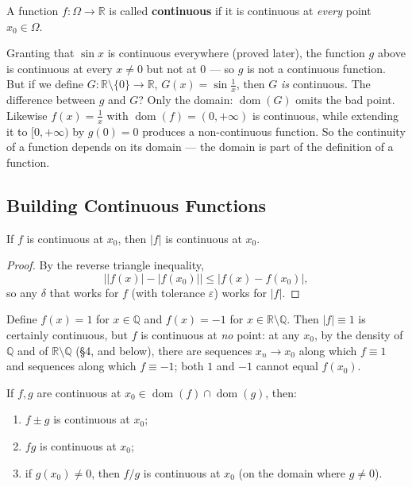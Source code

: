 \documentclass[11pt]{report}
\begin{document}
\begin{defbox}
A function $f: \Omega \to \mathbb{R}$ is called \textbf{continuous} if it is continuous at \emph{every} point $x_0 \in \Omega$.
\end{defbox}

\begin{rembox}
Granting that $\sin x$ is continuous everywhere (proved later), the function $g$ above is continuous at every $x \neq 0$ but not at $0$ --- so $g$ is not a continuous function. But if we define $G: \mathbb{R} \setminus \{0\} \to \mathbb{R}$, $G(x) = \sin\tfrac1x$, then $G$ \emph{is} continuous. The difference between $g$ and $G$? Only the domain: $\operatorname{dom}(G)$ omits the bad point. Likewise $f(x) = \tfrac1x$ with $\operatorname{dom}(f) = (0,+\infty)$ is continuous, while extending it to $[0,+\infty)$ by $g(0) = 0$ produces a non-continuous function. So the continuity of a function depends on its domain --- the domain is part of the definition of a function.
\end{rembox}

\subsection{Building Continuous Functions}

\begin{thmbox}
If $f$ is continuous at $x_0$, then $|f|$ is continuous at $x_0$.
\end{thmbox}

\begin{proof}
By the reverse triangle inequality,
\[
\bigl| |f(x)| - |f(x_0)| \bigr| \leq |f(x) - f(x_0)|,
\]
so any $\delta$ that works for $f$ (with tolerance $\varepsilon$) works for $|f|$.
\end{proof}

\begin{rembox}
Define $f(x) = 1$ for $x \in \mathbb{Q}$ and $f(x) = -1$ for $x \in \mathbb{R}\setminus\mathbb{Q}$. Then $|f| \equiv 1$ is certainly continuous, but $f$ is continuous at \emph{no} point: at any $x_0$, by the density of $\mathbb{Q}$ and of $\mathbb{R}\setminus\mathbb{Q}$ (\S 4, and below), there are sequences $x_n \to x_0$ along which $f \equiv 1$ and sequences along which $f \equiv -1$; both $1$ and $-1$ cannot equal $f(x_0)$.
\end{rembox}

\begin{thmbox}
If $f, g$ are continuous at $x_0 \in \operatorname{dom}(f) \cap \operatorname{dom}(g)$, then:
\begin{enumerate}[label=(\arabic*)]
    \item $f \pm g$ is continuous at $x_0$;
    \item $fg$ is continuous at $x_0$;
    \item if $g(x_0) \neq 0$, then $f/g$ is continuous at $x_0$ (on the domain where $g \neq 0$).
\end{enumerate}
\end{thmbox}
\end{document}
